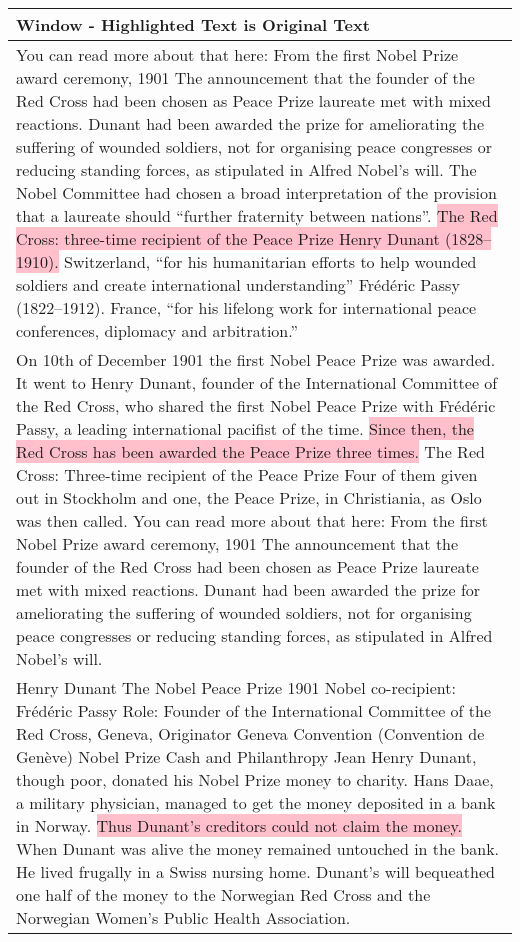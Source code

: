 \begin{table}[h!]
    \footnotesize
    \caption{Evaluation of text segmentation using a Sliding Window with window size 3, text chunks derived from the entry "Henry Dunant award Nobel Peace Prize".}
    \begin{xltabular}{\linewidth}{X}
        \toprule
        \textbf{Window} - Highlighted Text is Original Text \\
        \midrule
        You can read more about that here: From the first Nobel Prize award ceremony, 1901 The announcement that the founder of the Red Cross had been chosen as Peace Prize laureate met with mixed reactions. Dunant had been awarded the prize for ameliorating the suffering of wounded soldiers, not for organising peace congresses or reducing standing forces, as stipulated in Alfred Nobel’s will. The Nobel Committee had chosen a broad interpretation of the provision that a laureate should “further fraternity  between nations”. \colorbox{pink}{The Red Cross: three-time recipient of the Peace Prize Henry Dunant (1828–1910).}  Switzerland, “for his humanitarian efforts to help wounded soldiers and create international understanding” Frédéric Passy (1822–1912). France, “for his lifelong work for international peace conferences, diplomacy and arbitration.” \\ \hline
        On 10th of December 1901 the first Nobel Peace Prize was awarded. It went to Henry Dunant, founder of the International Committee of the Red Cross, who shared the first Nobel Peace Prize with Frédéric Passy, a leading international pacifist of the time. \colorbox{pink}{Since then, the Red Cross has been awarded the Peace Prize three times.} The Red Cross: Three-time recipient of the Peace Prize Four of them given out in Stockholm and one, the Peace Prize, in Christiania, as Oslo was then called. You can read more about that here: From the first Nobel Prize award ceremony, 1901 The announcement that the founder of the Red Cross had been chosen as Peace Prize laureate met with mixed reactions.  Dunant had been awarded the prize for ameliorating the suffering of wounded soldiers, not for  organising peace congresses or reducing standing forces, as stipulated in Alfred Nobel’s will. \\ \hline
        Henry Dunant The Nobel Peace Prize 1901 Nobel co-recipient: Frédéric Passy Role: Founder of the International Committee of the Red Cross, Geneva, Originator Geneva  Convention (Convention de Genève) Nobel Prize Cash and Philanthropy Jean Henry Dunant, though poor, donated his Nobel Prize money to charity. Hans Daae, a military physician, managed to get the money deposited in a bank in Norway. \colorbox{pink}{Thus Dunant’s creditors could not claim the money.} When Dunant was alive the money remained untouched in the bank. He lived frugally in a Swiss nursing home. Dunant’s will bequeathed one half of the money to the Norwegian Red Cross and the Norwegian Women’s Public Health Association. \\
        \bottomrule
    \end{xltabular}
    \label{tab:table-sliding-window}
\end{table}